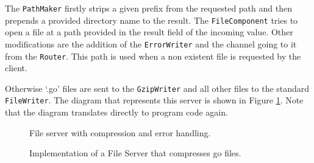 The \texttt{PathMaker} firstly strips a given
prefix from the requested path and then prepends a provided directory name to 
the result. The \texttt{FileComponent} tries to open a file at a path 
provided in the result field of the incoming value. Other modifications
are the addition of the \texttt{ErrorWriter} and the channel going to it from
the \texttt{Router}.
This path is used when a non existent file is requested by the client.

Otherwise `.go' files are sent to the \texttt{GzipWriter} and all other files to 
the standard \texttt{FileWriter}.
The diagram that represents this server is shown in 
Figure \ref{fig:fileServer3}. Note that the diagram translates directly 
to program code again.

\begin{figure}[h]
\centering
{}
\caption[scale=1.0]{File server with compression and error handling.}
\label{fig:fileServer3}
\end{figure}

\begin{figure}
\vspace{-1cm}

\caption[scale=1.0]{Implementation of a File Server that compresses go files.}
\label{fig:FileServerImpl}
\end{figure}

\newpage
